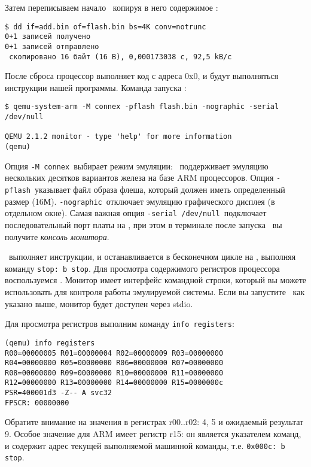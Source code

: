 Затем переписываем начало \ копируя в него содержимое
:

\begin{verbatim}
$ dd if=add.bin of=flash.bin bs=4K conv=notrunc
0+1 записей получено
0+1 записей отправлено
 скопировано 16 байт (16 B), 0,000173038 c, 92,5 kB/c
\end{verbatim}

После сброса процессор выполняет код с адреса 0x0, и будут выполняться
инструкции нашей программы. Команда запуска \qemu:

\begin{verbatim}
$ qemu-system-arm -M connex -pflash flash.bin -nographic -serial /dev/null

QEMU 2.1.2 monitor - type 'help' for more information
(qemu) 
\end{verbatim}

Опция \verb|-M connex|\ выбирает режим эмуляции: \qemu\ поддерживает эмуляцию
нескольких десятков вариантов железа на базе ARM процессоров. Опция \verb|-pflash|\
указывает файл образа флеша, который должен иметь определенный размер (16М).
\verb|-nographic|\ отключает эмуляцию графического дисплея (в отдельном окне).
Самая важная опция \verb|-serial /dev/null|\ подключает последовательный порт
платы на \file{/dev/null}, при этом в терминале после запуска \qemu\ вы получите
\emph{консоль монитора}.

\qemu\ выполняет инструкции, и останавливается в бесконечном цикле на
\var{stop}, выполняя команду \verb|stop: b stop|. Для просмотра содержимого
регистров процессора воспользуемся \termdef{монитором}{монитор \qemu}.
Монитор имеет интерфейс командной строки, который вы можете использовать для
контроля работы эмулируемой системы. Если вы запустите \qemu\ как указано выше,
монитор будет доступен через stdio.

Для просмотра регистров выполним команду \verb|info registers|:

\begin{verbatim}
(qemu) info registers
R00=00000005 R01=00000004 R02=00000009 R03=00000000
R04=00000000 R05=00000000 R06=00000000 R07=00000000
R08=00000000 R09=00000000 R10=00000000 R11=00000000
R12=00000000 R13=00000000 R14=00000000 R15=0000000c
PSR=400001d3 -Z-- A svc32
FPSCR: 00000000
\end{verbatim}

Обратите внимание на значения в регистрах r00..r02: 4, 5 и ожидаемый результат
9. Особое значение для ARM имеет регистр r15: он является указателем команд, и
содержит адрес текущей выполняемой машинной команды, т.е. \verb|0x000c: b stop|.

